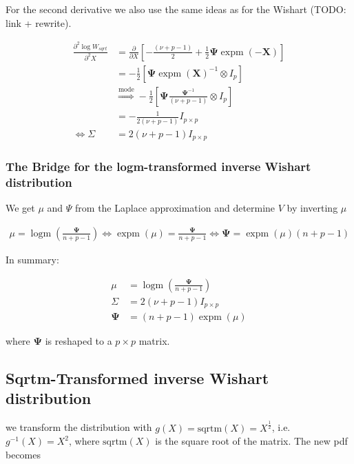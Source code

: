 For the second derivative we also use the same ideas as for the Wishart (TODO: link + rewrite). 

\begin{align}
	\frac{\partial^2 \log W_{sqrt}}{\partial^2 X} &= \frac{\partial }{\partial X} \left[-\frac{(\nu+p-1)}{2} + \frac{1}{2}\mathbf\Psi\operatorname{expm}(\mathbf{-X}) \right] \\
	&= -\frac{1}{2}\left[\mathbf\Psi\operatorname{expm}(\mathbf{X})^{-1} \otimes I_p\right] \\
	&\overset{\text{mode}}{\Rightarrow} -\frac{1}{2}\left[\mathbf\Psi\frac{\mathbf\Psi^{-1}}{(\nu+p-1)} \otimes I_p\right] \\
	&= -\frac{1}{2(\nu+p-1)} I_{p\times p} \\
	\Leftrightarrow \Sigma &= 2(\nu+p-1) I_{p\times p}
\end{align}

\subsubsection{The Bridge for the logm-transformed inverse Wishart distribution}

We get $\mu$ and $\Psi$ from the Laplace approximation and determine $V$ by inverting $\mu$

\begin{align}
	\mu = \operatorname{logm}\left(\frac{\mathbf\Psi}{n+p-1}\right) \Leftrightarrow \operatorname{expm}(\mu) = \frac{\mathbf\Psi}{n+p-1} \Leftrightarrow \mathbf\Psi = \operatorname{expm}(\mu)(n+p-1)
\end{align}

In summary: 

\begin{align}
	\mu &= \operatorname{logm}\left(\frac{\mathbf\Psi}{n+p-1}\right) \\
	\Sigma &= 2(\nu+p-1) I_{p\times p} \\
	\mathbf{\Psi} &=  (n+p-1)\operatorname{expm}(\mu)
\end{align}

where $\mathbf{\Psi}$ is reshaped to a $p \times p$ matrix. 

\subsection{Sqrtm-Transformed inverse Wishart distribution}

we transform the distribution with $g(X) = \text{sqrtm}(X) = X^{\frac{1}{2}}$, i.e. $g^{-1}(X) = X^2$, where $\text{sqrtm}(X)$ is the square root of the matrix. The new pdf becomes 

